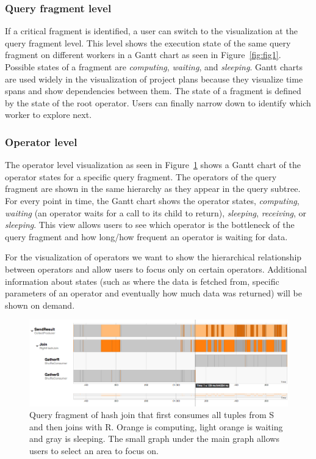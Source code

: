 \documentclass[11pt]{scrartcl}
\begin{document}
\subsubsection{Query fragment level}

If a critical fragment is identified, a user can switch to the visualization at the query fragment level. This level shows the execution state of the same query fragment on different workers in a Gantt chart as seen in Figure~\ref{fig:fig1}. Possible states of a fragment are \emph{computing}, \emph{waiting}, and \emph{sleeping}. Gantt charts are used widely in the visualization of project plans because they visualize time spans and show dependencies between them. The state of a fragment is defined by the state of the root operator. Users can finally narrow down to identify which worker to explore next.


\subsubsection{Operator level}

The operator level visualization as seen in Figure~\ref{fig:gantt} shows a Gantt chart of the operator states for a specific query fragment. The operators of the query fragment are shown in the same hierarchy as they appear in the query subtree. For every point in time, the Gantt chart shows the operator states, \emph{computing}, \emph{waiting} (an operator waits for a call to its child to return), \emph{sleeping}, \emph{receiving}, or \emph{sleeping}. This view allows users to see which operator is the bottleneck of the query fragment and how long/how frequent an operator is waiting for data.

For the visualization of operators we want to show the hierarchical relationship between operators and allow users to focus only on certain operators. Additional information about states (such as where the data is fetched from, specific parameters of an operator and eventually how much data was returned) will be shown on demand.

\begin{figure}[h]
  \begin{center}
    \includegraphics[width=\textwidth]{join_gantt}
  \end{center}
  \caption{Query fragment of hash join that first consumes all tuples from S and then joins with R. Orange is computing, light orange is waiting and gray is sleeping. The small graph under the main graph allows users to select an area to focus on.}
  \label{fig:gantt}
\end{figure}
\end{document}
